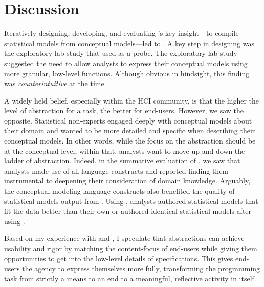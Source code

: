 \section{Discussion}
Iteratively designing, developing, and evaluating \tisane's key insight---to
compile statistical models from conceptual models---led to \rTisane. A key step
in designing \rTisane was the exploratory lab study that used \tisane as a
probe. The exploratory lab study suggested the need to allow analysts to express
their conceptual models using more granular, low-level functions. Although
obvious in hindsight, this finding was \textit{counterintuitive} at the time. 

A widely held belief, especially within the HCI community, is that the higher
the level of abstraction for a task, the better for end-users. However, we saw
the opposite. Statistical non-experts engaged deeply with conceptual models
about their domain and wanted to be more detailed and specific when describing
their conceptual models. In other words, while the focus on the abstraction
should be at the conceptual level, within that, analysts want to move up and
down the ladder of abstraction. Indeed, in the summative evaluation of \rTisane,
we saw that analysts made use of all language constructs and reported finding
them instrumental to deepening their consideration of domain knowledge.
Arguably, the conceptual modeling language constructs also benefited the quality
of statistical models output from \rTisane. Using \rTisane, analysts authored
statistical models that fit the data better than their own or authored identical
statistical models after using \rTisane.

Based on my experience with \tisane and \rTisane, I speculate that abstractions
can achieve usability and rigor by matching the content-focus of end-users while
giving them opportunities to get into the low-level details of specifications.
This gives end-users the agency to express themselves more fully, transforming
the programming task from strictly a means to an end to a meaningful, reflective
activity in itself. 


